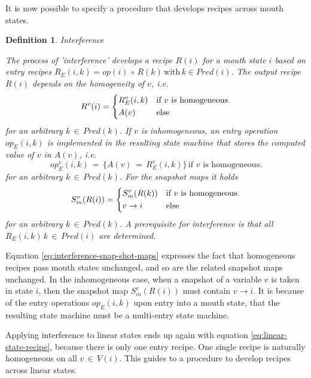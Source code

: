\documentclass[12pt,a4paper]{scrartcl}
\newtheorem{definition}{Definition}
\begin{document}
It is now possible to specify a procedure that develops recipes across mouth
states. 
\begin{definition} Interference

The process of 'interference' develops a recipe $R(i)$ for a mouth state $i$
based on entry recipes $R_E(i,k) = op(i)\,\circ\,R(k)\,\mbox{with}\,k \in Pred(i)$.
The output recipe $R(i)$ depends on the homogeneity of $v$, i.e. 
\begin{equation}
    R^v(i) = \begin{dcases*}
              R_E^v(i,k) & if $v$ is homogeneous.\\
              A(v)       & else
             \end{dcases*}
\end{equation}
for an arbitrary $k\,\in\,Pred(k)$. If $v$ is inhomogeneous, an entry
operation $op_E(i,k)$ is implemented in the resulting state machine that
stores the computed value of $v$ in $A(v)$, i.e.
\begin{equation}
    op_E^v(i,k) \,=\, \{ A(v) \,=\, R^v_E(i,k) \} \,\mbox{if $v$ is homogeneous}.
\end{equation}
for an arbitrary $k\,\in\,Pred(k)$. For the snapshot maps it holds
\begin{equation} \label{eq:interference-snap-shot-maps}
    S^v_m(R(i)) = \begin{dcases*}
                  S^v_m(R(k))    & if $v$ is homogeneous.\\
                  v \rightarrow i & else
                  \end{dcases*}
\end{equation}
for an arbitrary $k\,\in\,Pred(k)$. A prerequisite for interference is that 
all $R_E(i,k)\,k\,\in\,Pred(i)$ are determined.
\end{definition}
Equation \eqref{eq:interference-snap-shot-maps} expresses the fact that
homogeneous recipes pass mouth states unchanged, and so are the related
snapshot maps unchanged. In the inhomogeneous case, when a snapshot of a
variable $v$ is taken in state $i$, then the snapshot map $S_m^v(R(i))$
must contain $v \rightarrow i$. It is because of the entry operations
$op_E(i,k)$ upon entry into a mouth state, that the resulting state machine
must be a multi-entry state machine.

Applying interference to linear states ends up again with equation
\eqref{eq:linear-state-recipe}, because there is only one entry recipe.  One
single recipe is naturally homogeneous on all $v\,\in\,V(i)$. This guides to a
procedure to develop recipes across linear states.
\end{document}
